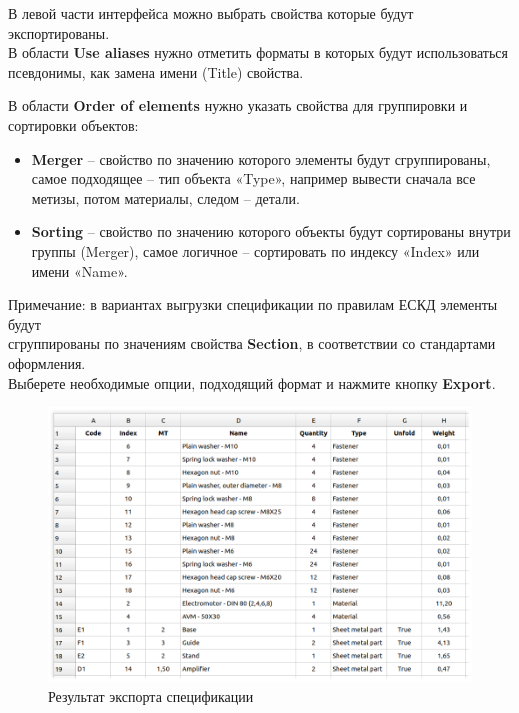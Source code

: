 \documentclass[a4paper,12pt]{article}
\begin{document}
В левой части интерфейса можно выбрать свойства которые будут экспортированы.\\

В области \textbf{Use aliases} нужно отметить форматы в которых будут использоваться псевдонимы, как замена имени (Title) свойства.\\

\pagebreak


В области \textbf{Order of elements} нужно указать свойства для группировки и сортировки объектов:

\begin{itemize}
	\item \textbf{Merger} -- свойство по значению которого элементы будут сгруппированы, самое подходящее -- тип объекта «Type», например вывести сначала все метизы, потом материалы, следом -- детали.
	\item \textbf{Sorting} -- свойство по значению которого объекты будут сортированы внутри группы (Merger), самое логичное -- сортировать по индексу «Index» или имени «Name».
\end{itemize}

Примечание: в вариантах выгрузки спецификации по правилам ЕСКД элементы будут\\сгруппированы по значениям свойства \textbf{Section}, в соответствии со стандартами оформления.\\

Выберете необходимые опции, подходящий формат и нажмите кнопку \textbf{Export}.

\begin{figure}[htp]
	\centering
	\includegraphics[width=1\textwidth]{img/specification_result.png}
	\caption{Результат экспорта спецификации}
	\label{sec:specification_result}
\end{figure}
\end{document}
